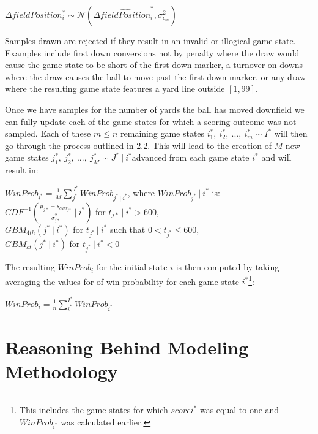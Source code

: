 \documentclass[12pt,twoside]{dukestatscithesis}
\begin{document}
\(\Delta fieldPosition_i^* \sim \mathcal N(\Delta\hat{fieldPosition}_i^*, \sigma^{2}_{\epsilon_m})\)

Samples drawn are rejected if they result in an invalid or illogical game state. Examples include first down conversions not by penalty where the draw would cause the game state to be short of the first down marker, a turnover on downs where the draw causes the ball to move past the first down marker, or any draw where the resulting game state features a yard line outside \([1, 99]\).

Once we have samples for the number of yards the ball has moved downfield we can fully update each of the game states for which a scoring outcome was not sampled. Each of these \(m \leq n\) remaining game states \(i^*_1, \: i^*_2, \:..., \:i^*_m \sim I^*\) will then go through the process outlined in 2.2. This will lead to the creation of \(M\) new game states \(j^*_1, \: j^*_2, \:..., \:j^*_M \sim J^* \:| \: i^*\)advanced from each game state \(i^*\) and will result in:

\(WinProb_{i^*} = \frac{1}{M}\sum_{j^*}^{J^*}WinProb_{j^* \: | \: i^*}\), where \(WinProb_{j^*} \: | \: i^*\) is:\\
\(CDF^{-1}(\frac{\hat{\mu}_{j*} + s_{curr_{j*}}}{\hat{\sigma}^{2}_{j*}}\:|\:i^*)\) for \(t_{j*}\:|\:i^* > 600\),\\
\(GBM_{4th}(j^*\:|\:i^*)\) for \(t_{j^*}\:|\:i^*\) such that \(0 < t_{j^*} \leq 600\),\\
\(GBM_{ot}(j^*\:|\:i^*)\) for \(t_{j^*}\:|\:i^* < 0\)

The resulting \(WinProb_i\) for the initial state \(i\) is then computed by taking averaging the values for of win probability for each game state \({i^*}\)\footnote{This includes the game states for which \(score{i^*}\) was equal to one and \(WinProb_{i^*}\) was calculated earlier.}:

\(WinProb_i = \frac{1}{n} \sum_{i^*}^{I^*}WinProb_{i^*}\)

\hypertarget{reasoning-behind-modeling-methodology}{%
\section{Reasoning Behind Modeling Methodology}\label{reasoning-behind-modeling-methodology}}
\end{document}
